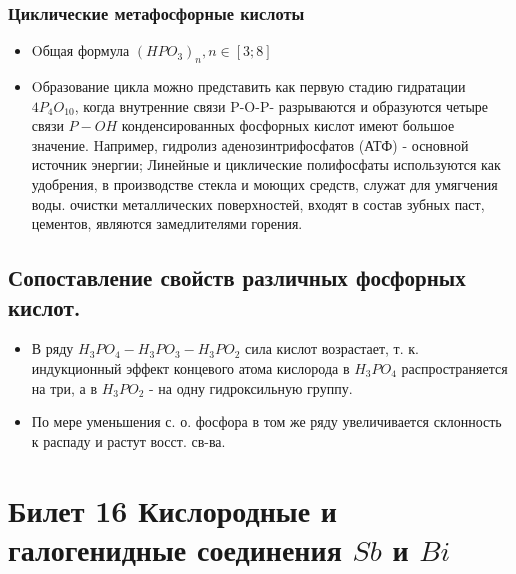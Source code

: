 \documentclass[11pt]{article}
\begin{document}
\subsubsection{Циклические метафосфорные кислоты}
\begin{itemize}
\item Oбщая формула $(HPO_3)_n, n\in [3;8]$
\item Oбразование цикла можно представить как первую стадию гидратации $4P_4O_{10}$, когда внутренние связи {P-O-P}- разрываются и образуются четыре связи $P-OH$
 конденсированных фосфорных кислот имеют большое значение. Hапример, гидролиз аденозинтрифосфатов (АТФ) - основной источник энергии; Линейные и циклические полифосфаты используются как удобрения, в производстве стекла и моющих средств, служат для умягчения воды. очистки металлических поверхностей, входят в состав зубных паст, цементов, являются замедлителями горения. 
\end{itemize}

\subsection{Сопоставление свойств различных фосфорных кислот.} 
\begin{itemize}

\item В ряду $H_3PO_4 - H_3PO_3 - H_3PO_2$ сила кислот возрастает, т. к. индукционный эффект концевого атома кислорода в $H_3PO_4$ распространяется на три, а в $H_3PO_2$ - на одну гидроксильную группу. 

\item По мере уменьшения с. о. фосфора в том же ряду увеличивается склонность к распаду и растут восст. св-ва. 
\end{itemize}


\section{Билет 16 Кислородные и галогенидные соединения $Sb$ и $Bi$}
\end{document}
